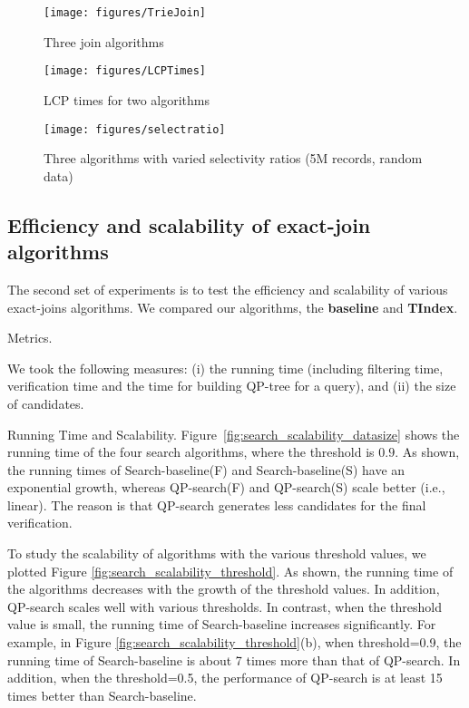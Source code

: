 \begin{figure}[t]
	\centering
	\texttt{[image: figures/TrieJoin]}
	\caption{Three join algorithms}
	\label{fig:similaritygeaph}
\end{figure}

\begin{figure}
	\centering
	\texttt{[image: figures/LCPTimes]}
	\caption{LCP times for two algorithms}
	\label{fig:LCPTimes}
\end{figure}

\begin{figure}
	\centering
	\texttt{[image: figures/selectratio]}
	\caption{Three algorithms with varied selectivity ratios (5M records, random data)}
	\label{fig:selectratio}
\end{figure}

\subsection{Efficiency and scalability of exact-join algorithms}

The second set of experiments is to test the efficiency and scalability of
various exact-joins algorithms. We compared our algorithms, the \textbf{baseline}
and \textbf{TIndex}.

Metrics.

 We took the following measures: (i) the running time (including filtering time, verification time and the time for building QP-tree for a query), and (ii) the size of candidates.

Running Time and Scalability.
Figure~\ref{fig:search_scalability_datasize} shows the running time of the four search algorithms, where the threshold is $0.9$. As shown, the running times of Search-baseline(F) and Search-baseline(S) have an exponential growth, whereas QP-search(F) and QP-search(S) scale better (i.e., linear). The reason is that QP-search generates less candidates for the final verification.

To study the scalability of algorithms with the various threshold values, we plotted Figure \ref{fig:search_scalability_threshold}. As shown, the running time of the algorithms decreases with the growth of the threshold values. In addition,  QP-search scales well with various thresholds. In contrast, when the threshold value is small, the running time of Search-baseline increases significantly. For example, in Figure \ref{fig:search_scalability_threshold}(b), when threshold=0.9, the running time of Search-baseline is about 7 times more than that of QP-search. In addition, when the threshold=0.5, the performance of QP-search is at least 15 times better than Search-baseline.

